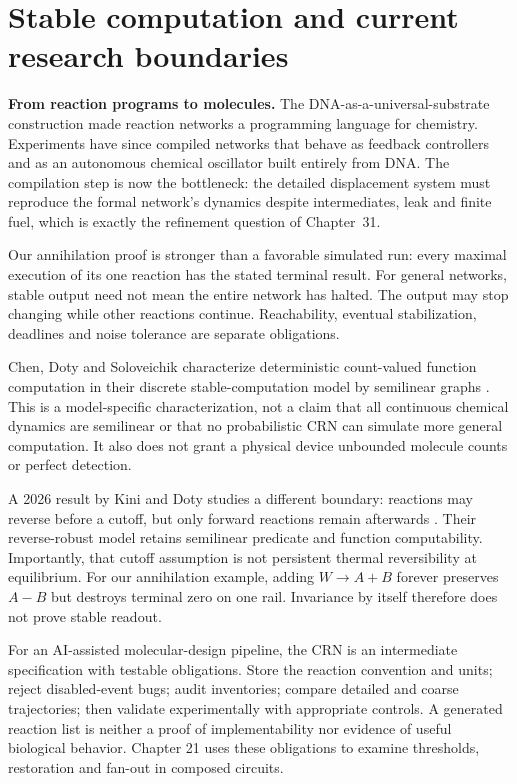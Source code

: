 \section{Stable computation and current research boundaries}
\begin{Frontier}
\textbf{From reaction programs to molecules.} The DNA-as-a-universal-substrate
construction made reaction networks a programming language for
chemistry.\cite{Soloveichik2010} Experiments have since compiled networks that
behave as feedback controllers\cite{Chen2013} and as an autonomous chemical
oscillator built entirely from DNA.\cite{Srinivas2017} The compilation step is
now the bottleneck: the detailed displacement system must reproduce the formal
network's dynamics despite intermediates, leak and finite fuel, which is exactly
the refinement question of Chapter~31.
\end{Frontier}


Our annihilation proof is stronger than a favorable simulated run: every
maximal execution of its one reaction has the stated terminal result.
For general networks, stable output need not mean the entire network has
halted. The output may stop changing while other reactions continue.
Reachability, eventual stabilization, deadlines and noise tolerance are
separate obligations.

Chen, Doty and Soloveichik characterize deterministic count-valued function
computation in their discrete stable-computation model by semilinear graphs
\cite{Chen2014}. This is a model-specific characterization, not a claim that all
continuous chemical dynamics are semilinear or that no probabilistic CRN can
simulate more general computation. It also does not grant a physical device
unbounded molecule counts or perfect detection.

A 2026 result by Kini and Doty studies a different boundary: reactions may
reverse before a cutoff, but only forward reactions remain afterwards
\cite{KiniDoty2026}. Their reverse-robust model retains semilinear predicate and
function computability. Importantly, that cutoff assumption is not persistent
thermal reversibility at equilibrium. For our annihilation example, adding
$W\rightarrow A+B$ forever preserves $A-B$ but destroys terminal zero on one
rail. Invariance by itself therefore does not prove stable readout.

For an AI-assisted molecular-design pipeline, the CRN is an intermediate
specification with testable obligations. Store the reaction convention and
units; reject disabled-event bugs; audit inventories; compare detailed and
coarse trajectories; then validate experimentally with appropriate controls.
A generated reaction list is neither a proof of implementability nor evidence
of useful biological behavior. Chapter 21 uses these obligations to examine
thresholds, restoration and fan-out in composed circuits.

